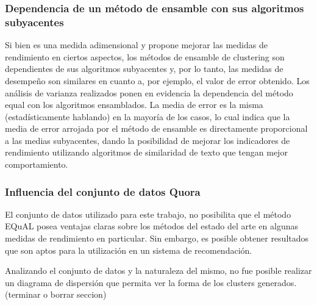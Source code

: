 \subsubsection{Dependencia de un método de ensamble con sus algoritmos subyacentes}
Si bien es una medida adimensional y propone mejorar las medidas de rendimiento en ciertos aspectos, los métodos de ensamble de clustering son dependientes de sus algoritmos subyacentes y, por lo tanto, las medidas de desempeño son similares en cuanto a, por ejemplo, el valor de error obtenido. Los análisis de varianza realizados ponen en evidencia la dependencia del método equal con los algoritmos ensamblados. La media de error es la misma (estadísticamente hablando) en la mayoría de los casos, lo cual indica que la media de error arrojada por el método de ensamble es directamente proporcional a las medias subyacentes, dando la posibilidad de mejorar los indicadores de rendimiento utilizando algoritmos de similaridad de texto que tengan mejor comportamiento.

\subsubsection{Influencia del conjunto de datos Quora}
El conjunto de datos utilizado para este trabajo, no posibilita que el método EQuAL posea ventajas claras sobre los métodos del estado del arte en algunas medidas de rendimiento en particular. Sin embargo, es posible obtener resultados que son aptos para la utilización en un sistema de recomendación.

\bigskip Analizando el conjunto de datos y la naturaleza del mismo, no fue posible realizar un diagrama de dispersión que permita ver la forma de los clusters generados.
(terminar o borrar seccion)
